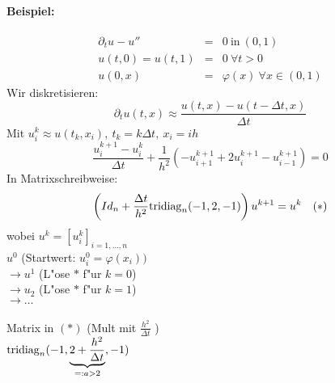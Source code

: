 \documentclass{scrartcl}
\begin{document}
\paragraph*{Beispiel:}
\begin{eqnarray*}
\partial_t u - u'' & = & 0 \ \mathrm{in \ } (0,1) \\
u(t,0) = u(t,1) & = & 0 \ \forall t > 0 \\
u(0,x) & = & \varphi(x) \ \forall x \in (0,1)
\end{eqnarray*}
Wir diskretisieren: 
$$ \partial_t u(t,x) \approx \frac{u(t,x) - u(t - \Delta t, x)}{\Delta t} $$
Mit $u_i^k \approx u(t_k, x_i), \ t_k = k \Delta t, \ x_i = ih$\\
$$ \frac{u_i^{k+1} - u_i^k}{\Delta t} + \frac{1}{h^2} ( - u_{i+1}^{k+1} + 2u_i^{k+1} - u_{i-1}^{k+1} ) = 0$$
In Matrixschreibweise:
$$ \left( Id_n + \frac{\Delta t}{h^2} \mathrm{tridiag}_n (-1, 2, -1) \right) u^{k+1} = u^k \quad (*)$$
wobei $u^k = \left[ u_i^k \right]_{i=1, \ldots, n}$ \\
$u^0$ (Startwert: $u_i^0 = \varphi(x_i))$ \\
$\rightarrow u^1$ (L"ose $*$ f"ur $k=0$) \\
$\rightarrow u_2$ (L"ose $*$ f"ur $k=1$) \\
$\rightarrow \ldots$ \\
\\
Matrix in $(*)$ (Mult mit $\frac{h^2}{\Delta t}$ )\\
$\mathrm{tridiag}_n (-1, \underbrace{ 2 + \frac{h^2}{\Delta t}}_{=: a > 2}, -1)$
\end{document}
